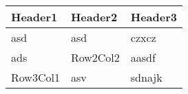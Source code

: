 \begin{tabular}{|l | l | l|}
\hline
Header1 & Header2 & Header3 \\
\hline
asd & asd & czxcz \\
\hline
ads & Row2Col2 & aasdf \\
\hline
Row3Col1 & asv & sdnajk \\
\hline
\end{tabular}
